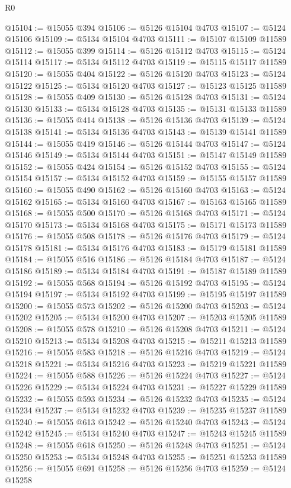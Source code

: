 \begin{lexlean}{R0}
\begin{coremodule}
@15104 := @15055 @394
@15106 := @5126 @15104 @4703
@15107 := @5124 @15106
@15109 := @5134 @15104 @4703
@15111 := @15107 @15109 @11589
@15112 := @15055 @399
@15114 := @5126 @15112 @4703
@15115 := @5124 @15114
@15117 := @5134 @15112 @4703
@15119 := @15115 @15117 @11589
@15120 := @15055 @404
@15122 := @5126 @15120 @4703
@15123 := @5124 @15122
@15125 := @5134 @15120 @4703
@15127 := @15123 @15125 @11589
@15128 := @15055 @409
@15130 := @5126 @15128 @4703
@15131 := @5124 @15130
@15133 := @5134 @15128 @4703
@15135 := @15131 @15133 @11589
@15136 := @15055 @414
@15138 := @5126 @15136 @4703
@15139 := @5124 @15138
@15141 := @5134 @15136 @4703
@15143 := @15139 @15141 @11589
@15144 := @15055 @419
@15146 := @5126 @15144 @4703
@15147 := @5124 @15146
@15149 := @5134 @15144 @4703
@15151 := @15147 @15149 @11589
@15152 := @15055 @424
@15154 := @5126 @15152 @4703
@15155 := @5124 @15154
@15157 := @5134 @15152 @4703
@15159 := @15155 @15157 @11589
@15160 := @15055 @490
@15162 := @5126 @15160 @4703
@15163 := @5124 @15162
@15165 := @5134 @15160 @4703
@15167 := @15163 @15165 @11589
@15168 := @15055 @500
@15170 := @5126 @15168 @4703
@15171 := @5124 @15170
@15173 := @5134 @15168 @4703
@15175 := @15171 @15173 @11589
@15176 := @15055 @508
@15178 := @5126 @15176 @4703
@15179 := @5124 @15178
@15181 := @5134 @15176 @4703
@15183 := @15179 @15181 @11589
@15184 := @15055 @516
@15186 := @5126 @15184 @4703
@15187 := @5124 @15186
@15189 := @5134 @15184 @4703
@15191 := @15187 @15189 @11589
@15192 := @15055 @568
@15194 := @5126 @15192 @4703
@15195 := @5124 @15194
@15197 := @5134 @15192 @4703
@15199 := @15195 @15197 @11589
@15200 := @15055 @573
@15202 := @5126 @15200 @4703
@15203 := @5124 @15202
@15205 := @5134 @15200 @4703
@15207 := @15203 @15205 @11589
@15208 := @15055 @578
@15210 := @5126 @15208 @4703
@15211 := @5124 @15210
@15213 := @5134 @15208 @4703
@15215 := @15211 @15213 @11589
@15216 := @15055 @583
@15218 := @5126 @15216 @4703
@15219 := @5124 @15218
@15221 := @5134 @15216 @4703
@15223 := @15219 @15221 @11589
@15224 := @15055 @588
@15226 := @5126 @15224 @4703
@15227 := @5124 @15226
@15229 := @5134 @15224 @4703
@15231 := @15227 @15229 @11589
@15232 := @15055 @593
@15234 := @5126 @15232 @4703
@15235 := @5124 @15234
@15237 := @5134 @15232 @4703
@15239 := @15235 @15237 @11589
@15240 := @15055 @613
@15242 := @5126 @15240 @4703
@15243 := @5124 @15242
@15245 := @5134 @15240 @4703
@15247 := @15243 @15245 @11589
@15248 := @15055 @618
@15250 := @5126 @15248 @4703
@15251 := @5124 @15250
@15253 := @5134 @15248 @4703
@15255 := @15251 @15253 @11589
@15256 := @15055 @691
@15258 := @5126 @15256 @4703
@15259 := @5124 @15258

\end{coremodule}
\end{lexlean}
